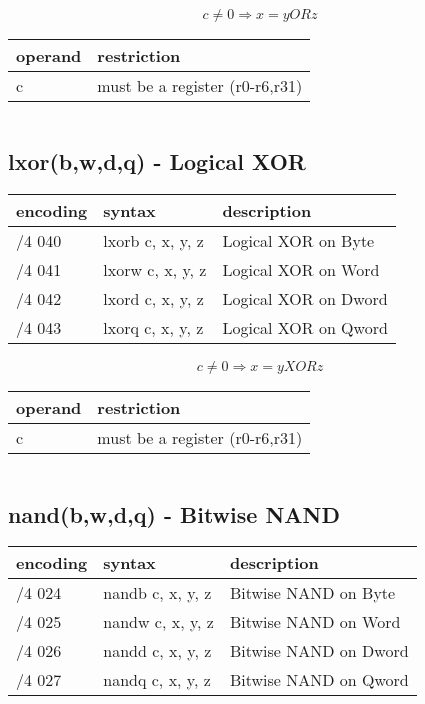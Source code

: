 \documentclass[letterpaper,10pt,openright,twoside,onecolumn]{book}
\begin{document}
  \begin{displaymath} c \neq 0 \Rightarrow x = y OR z\end{displaymath}

  \flushleft
  \begin{tabular}{|l|l|}
   \hline
    operand & restriction \\
   \hline
    c & must be a register (r0-r6,r31) \\
   \hline
  \end{tabular}
  \begin{verbatim}
  \end{verbatim}

\newpage\subsection{lxor(b,w,d,q) - Logical XOR}
  \begin{tabular}{|l|l|l|}
   \hline
    encoding & syntax & description \\
   \hline
    /4 040 & lxorb c, x, y, z & Logical XOR on Byte \\
    /4 041 & lxorw c, x, y, z & Logical XOR on Word \\
    /4 042 & lxord c, x, y, z & Logical XOR on Dword \\
    /4 043 & lxorq c, x, y, z & Logical XOR on Qword \\
   \hline
  \end{tabular}

  \begin{displaymath} c \neq 0 \Rightarrow x = y XOR z\end{displaymath}

  \flushleft
  \begin{tabular}{|l|l|}
   \hline
    operand & restriction \\
   \hline
    c & must be a register (r0-r6,r31) \\
   \hline
  \end{tabular}
  \begin{verbatim}
  \end{verbatim}


\newpage\subsection{nand(b,w,d,q) - Bitwise NAND}
  \begin{tabular}{|l|l|l|}
   \hline
    encoding & syntax & description \\
   \hline
    /4 024 & nandb c, x, y, z & Bitwise NAND on Byte\\
    /4 025 & nandw c, x, y, z & Bitwise NAND on Word \\
    /4 026 & nandd c, x, y, z & Bitwise NAND on Dword \\
    /4 027 & nandq c, x, y, z & Bitwise NAND on Qword \\
   \hline
  \end{tabular}
\end{document}
